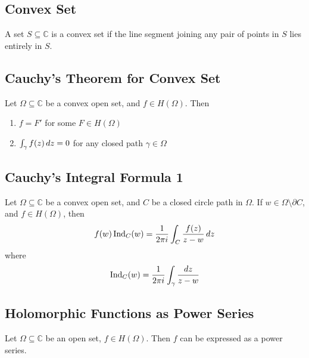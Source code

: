 \subsection{Convex Set} %
\label{sub:convex_set}
A set $S \subseteq \mathbb{C}$ is a convex set if the line segment joining any pair of points in $S$ lies entirely in $S$.

\subsection{Cauchy's Theorem for Convex Set} %
\label{sub:cauchy_s_theorem_for_convex_set}
Let $\Omega \subseteq \mathbb{C}$ be a convex open set, and $f \in H(\Omega)$. Then
\begin{enumerate}
	\item $f = F'$ for some $F \in H(\Omega)$
	\item $\int_{\gamma} f(z) \dif{z} = 0$ for any closed path $\gamma \in \Omega$
\end{enumerate}

\subsection{Cauchy's Integral Formula 1} %
\label{sub:cauchy_s_integral_formula_1}
Let $\Omega \subseteq \mathbb{C}$ be a convex open set, and $C$ be a closed circle path in $\Omega$. If $w \in \Omega \setminus \partial C$, and $f \in H(\Omega)$, then
\begin{equation*}
	f(w) \ind{w}{C} = \frac{1}{2 \pi i} \int_{C} \frac{f(z)}{z - w} \dif{z}
\end{equation*}
where
\begin{equation*}
	\ind{w}{C} = \frac{1}{2 \pi i} \int_{\gamma} \frac{\dif{z}}{z - w}
\end{equation*}

\subsection{Holomorphic Functions as Power Series} %
\label{sub:holomorphic_functions_as_power_series}
Let $\Omega \subseteq \mathbb{C}$ be an open set, $f \in H(\Omega)$. Then $f$ can be expressed as a power series.

